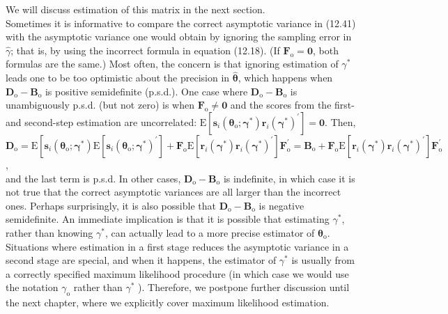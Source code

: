 \documentclass[10pt]{article}
\begin{document}
We will discuss estimation of this matrix in the next section.\\
Sometimes it is informative to compare the correct asymptotic variance in (12.41) with the asymptotic variance one would obtain by ignoring the sampling error in $\hat{\gamma}$; that is, by using the incorrect formula in equation (12.18). (If $\mathbf{F}_{\mathrm{o}}=\mathbf{0}$, both formulas are the same.) Most often, the concern is that ignoring estimation of $\gamma^{*}$ leads one to be too optimistic about the precision in $\hat{\boldsymbol{\theta}}$, which happens when $\mathbf{D}_{\mathrm{o}}-\mathbf{B}_{\mathrm{o}}$ is positive semidefinite (p.s.d.). One case where $\mathbf{D}_{\mathrm{o}}-\mathbf{B}_{\mathrm{o}}$ is unambiguously p.s.d. (but not zero) is when $\mathbf{F}_{\mathrm{o}} \neq \mathbf{0}$ and the scores from the first- and second-step estimation are uncorrelated: $\mathrm{E}\left[\mathbf{s}_{i}\left(\boldsymbol{\theta}_{\mathrm{o}} ; \boldsymbol{\gamma}^{*}\right) \mathbf{r}_{i}\left(\boldsymbol{\gamma}^{*}\right)^{\prime}\right]=\mathbf{0}$. Then,\\
$\mathbf{D}_{\mathrm{o}}=\mathrm{E}\left[\mathbf{s}_{i}\left(\boldsymbol{\theta}_{\mathrm{o}} ; \boldsymbol{\gamma}^{*}\right) \mathrm{E}\left[\mathbf{s}_{i}\left(\boldsymbol{\theta}_{\mathrm{o}} ; \boldsymbol{\gamma}^{*}\right)^{\prime}\right]+\mathbf{F}_{\mathrm{o}} \mathrm{E}\left[\mathbf{r}_{i}\left(\boldsymbol{\gamma}^{*}\right) \mathbf{r}_{i}\left(\boldsymbol{\gamma}^{*}\right)^{\prime}\right] \mathbf{F}_{\mathrm{o}}^{\prime}=\mathbf{B}_{\mathrm{o}}+\mathbf{F}_{\mathrm{o}} \mathrm{E}\left[\mathbf{r}_{i}\left(\boldsymbol{\gamma}^{*}\right) \mathbf{r}_{i}\left(\boldsymbol{\gamma}^{*}\right)^{\prime}\right] \mathbf{F}_{\mathrm{o}}^{\prime}\right.$,\\
and the last term is p.s.d. In other cases, $\mathbf{D}_{\mathrm{o}}-\mathbf{B}_{\mathrm{o}}$ is indefinite, in which case it is not true that the correct asymptotic variances are all larger than the incorrect ones. Perhaps surprisingly, it is also possible that $\mathbf{D}_{\mathrm{o}}-\mathbf{B}_{\mathrm{o}}$ is negative semidefinite. An immediate implication is that it is possible that estimating $\gamma^{*}$, rather than knowing $\gamma^{*}$, can actually lead to a more precise estimator of $\boldsymbol{\theta}_{\mathrm{o}}$. Situations where estimation in a first stage reduces the asymptotic variance in a second stage are special, and when it happens, the estimator of $\gamma^{*}$ is usually from a correctly specified maximum likelihood procedure (in which case we would use the notation $\gamma_{\mathrm{o}}$ rather than $\gamma^{*}$ ). Therefore, we postpone further discussion until the next chapter, where we explicitly cover maximum likelihood estimation.
\end{document}
